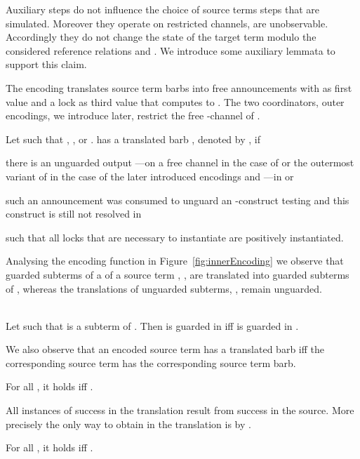 \documentclass[]{eptcs}
\begin{document}
Auxiliary steps do not influence the choice of source terms steps that are simulated. Moreover they operate on restricted channels, \ie are unobservable. Accordingly they do not change the state of the target term modulo the considered reference relations  and . We introduce some auxiliary lemmata to support this claim.

The encoding  translates source term barbs  into free announcements with  as first value and a lock  as third value that computes to . The two coordinators, \ie outer encodings, we introduce later, restrict the free -channel of .

\begin{definition}
	Let  such that , , or .
	 has a translated barb , denoted by , if
	\begin{compactitem}
		\item there is an unguarded output ---on a free channel  in the case of  or the outermost variant of  in the case of the later introduced encodings  and ---in  or
		\item such an announcement was consumed to unguard an -construct testing  and this construct is still not resolved in 
	\end{compactitem}
	such that all locks that are necessary to instantiate  are positively instantiated.
\end{definition}

Analysing the encoding function in Figure~\ref{fig:innerEncoding} we observe that guarded subterms  of a of a source term , \eg , are translated into guarded subterms of , whereas the translations of unguarded subterms, \eg , remain unguarded.

\begin{obs}
	\\
	Let  such that  is a subterm of . Then  is guarded in  iff  is guarded in .
	\label{obs:guardedSourceVsTarget}
\end{obs}

We also observe that an encoded source term has a translated barb iff the corresponding source term has the corresponding source term barb.

\begin{obs}
	For all , it holds  iff .
	\label{obs:transBarbs}
\end{obs}

All instances of success in the translation result from success in the source. More precisely the only way to obtain  in the translation is by .

\begin{obs}
	For all , it holds  iff .
	\label{obs:success}
\end{obs}
\end{document}
